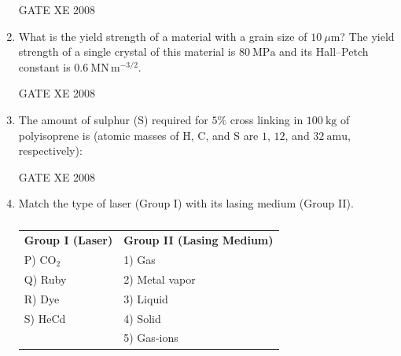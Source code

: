 \documentclass[12pt]{article}
\begin{document}
\begin{enumerate}
GATE XE 2008

\item What is the yield strength of a material with a grain size of $10 \ \mu \mathrm{m}$? The yield strength of a single crystal of this material is $80 \ \mathrm{MPa}$ and its Hall–Petch constant is $0.6 \ \mathrm{MN \, m^{-3/2}}$.

\begin{enumerate}
\end{enumerate}

GATE XE 2008

\item The amount of sulphur (S) required for $5\%$ cross linking in $100 \ \mathrm{kg}$ of polyisoprene is (atomic masses of H, C, and S are $1$, $12$, and $32 \ \mathrm{amu}$, respectively):

\begin{enumerate}
\end{enumerate}

GATE XE 2008

\item Match the type of laser (Group I) with its lasing medium (Group II).

\begin{table}[H]     \centering     \caption{}     \label{}     \begin{tabular}{l l}
\textbf{Group I (Laser)} & \textbf{Group II (Lasing Medium)} \\
P) CO$_2$ & 1) Gas \\
Q) Ruby & 2) Metal vapor \\
R) Dye & 3) Liquid \\
S) HeCd & 4) Solid \\
 & 5) Gas-ions \\
\end{tabular} \end{table}


\end{enumerate}
\end{document}
